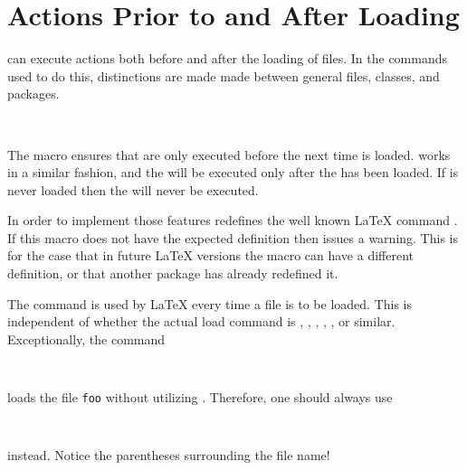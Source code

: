 \section{Actions Prior to and After Loading}
\label{sec:scrlfile.macros}

 can execute actions both before and after the
loading of files. In the commands used to do this, distinctions are
made made between general files, classes, and packages.

\begin{Declaration}
  \\
\end{Declaration}%
%
%
The macro  ensures that  are
only executed before the next time  is loaded.
 works in a similar fashion, and the
 will be executed only after the  has
been loaded.  If  is never loaded then the
 will never be executed.

\begin{Explain}
  In order to implement those features  redefines
  the well known {\LaTeX} command . If this
  macro does not have the expected definition then 
  issues a warning.  This is for the case that in future {\LaTeX}
  versions the macro can have a different definition, or that another
  package has already redefined it.
  
  The command  is used by {\LaTeX} every time
  a file is to be loaded.  This is independent of whether the actual
  load command is , ,
  , , ,
  or similar. Exceptionally, the command
  \begin{lstlisting}
    
  \end{lstlisting}
  loads the file \texttt{foo} without utilizing
  . Therefore, one should always use
  \begin{lstlisting}
    
  \end{lstlisting}
  instead. Notice the parentheses surrounding the file name!
\end{Explain}
%
%
%


